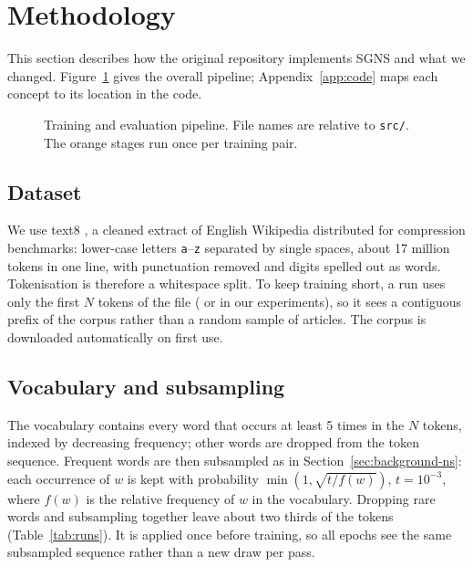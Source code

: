 \section{Methodology}
\label{sec:method}

This section describes how the original repository implements SGNS and what we changed. Figure~\ref{fig:pipeline} gives the overall pipeline; Appendix~\ref{app:code} maps each concept to its location in the code.

\begin{figure}[t]
    \centering
    \resizebox{\linewidth}{!}{}
    \caption{Training and evaluation pipeline. File names are relative to \texttt{src/}. The orange stages run once per training pair.}
    \label{fig:pipeline}
\end{figure}

\subsection{Dataset}

We use text8 \citep{mahoney_text8}, a cleaned extract of English Wikipedia distributed for compression benchmarks: lower-case letters \texttt{a}--\texttt{z} separated by single spaces, about 17 million tokens in one line, with punctuation removed and digits spelled out as words. Tokenisation is therefore a whitespace split. To keep training short, a run uses only the first $N$ tokens of the file (\DemoTokens{} or \FinalTokens{} in our experiments), so it sees a contiguous prefix of the corpus rather than a random sample of articles. The corpus is downloaded automatically on first use.

\subsection{Vocabulary and subsampling}

The vocabulary contains every word that occurs at least 5 times in the $N$ tokens, indexed by decreasing frequency; other words are dropped from the token sequence. Frequent words are then subsampled as in Section~\ref{sec:background-ns}: each occurrence of $w$ is kept with probability $\min\!\left(1, \sqrt{t / f(w)}\right)$, $t = 10^{-3}$, where $f(w)$ is the relative frequency of $w$ in the vocabulary. Dropping rare words and subsampling together leave about two thirds of the tokens (Table~\ref{tab:runs}). It is applied once before training, so all epochs see the same subsampled sequence rather than a new draw per pass.

